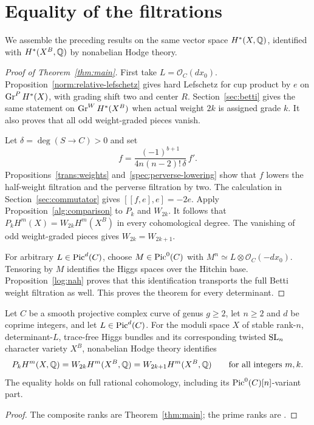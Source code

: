 \section{Equality of the filtrations}\label{sec:conclusion}

We assemble the preceding results on the same vector space $H^*(X,\mathbb Q)$, identified with $H^*(X^B,\mathbb Q)$ by nonabelian Hodge theory.

\begin{proof}[Proof of Theorem~\ref{thm:main}]
First take $L=\mathcal O_C(dx_0)$. Proposition~\ref{norm:relative-lefschetz} gives hard Lefschetz for cup product by $e$ on $\operatorname{Gr}^P H^*(X)$, with grading shift two and center $R$. Section~\ref{sec:betti} gives the same statement on $\operatorname{Gr}^W H^*(X^B)$ when actual weight $2k$ is assigned grade $k$. It also proves that all odd weight-graded pieces vanish.

Let $\delta=\deg(S\to C)>0$ and set
\[
f=\frac{(-1)^{b+1}}{4n(n-2)!\,\delta}\,f'.
\]
Propositions~\ref{trans:weights} and~\ref{spec:perverse-lowering} show that $f$ lowers the half-weight filtration and the perverse filtration by two. The calculation in Section~\ref{sec:commutator} gives $[[f,e],e]=-2e$. Apply Proposition~\ref{alg:comparison} to $P_k$ and $W_{2k}$. It follows that
$P_kH^m(X)=W_{2k}H^m(X^B)$ in every cohomological degree. The vanishing of odd weight-graded pieces gives $W_{2k}=W_{2k+1}$.

For arbitrary $L\in\operatorname{Pic}^d(C)$, choose $M\in\operatorname{Pic}^0(C)$ with
$M^n\simeq L\otimes\mathcal O_C(-dx_0)$. Tensoring by $M$ identifies the Higgs spaces over the Hitchin base. Proposition~\ref{log:nah} proves that this identification transports the full Betti weight filtration as well. This proves the theorem for every determinant.
\end{proof}

\begin{corollary}
Let $C$ be a smooth projective complex curve of genus $g\ge2$, let
$n\ge2$ and $d$ be coprime integers, and let $L\in\operatorname{Pic}^d(C)$.
For the moduli space $X$ of stable rank-$n$, determinant-$L$, trace-free
Higgs bundles and its corresponding twisted $\operatorname{SL}_n$ character variety
$X^B$, nonabelian Hodge theory identifies
\[
 P_k H^m(X,\mathbb Q)=W_{2k}H^m(X^B,\mathbb Q)=W_{2k+1}H^m(X^B,\mathbb Q)
 \qquad\text{for all integers }m,k.
\]
The equality holds on full rational cohomology, including its
$\operatorname{Pic}^0(C)[n]$-variant part.
\end{corollary}
\begin{proof}
The composite ranks are Theorem~\ref{thm:main}; the prime ranks are \cite[Theorem~0.3]{MS2024}.
\end{proof}

